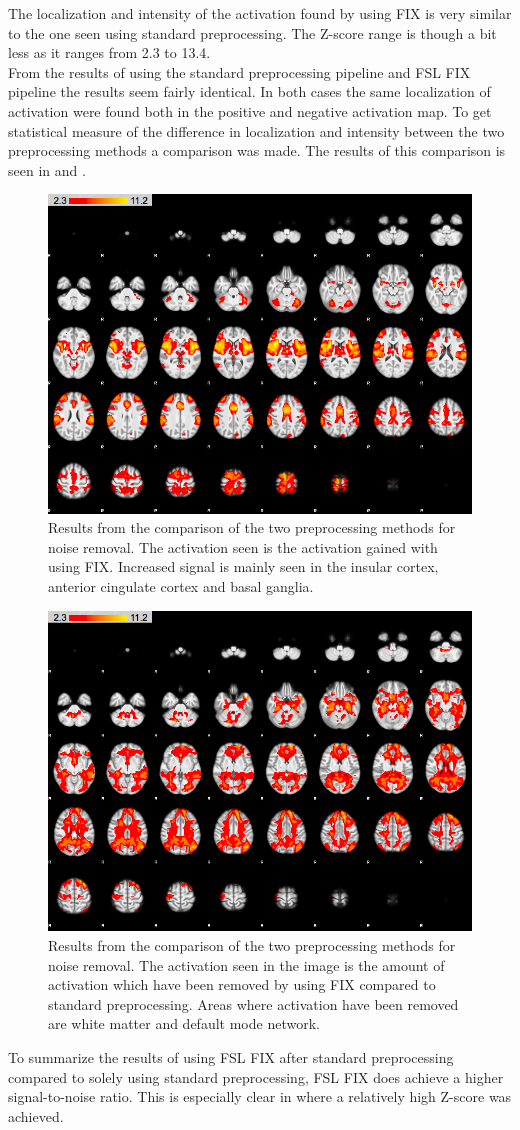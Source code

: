 The localization and intensity of the activation found by using FIX is very similar to the one seen using standard preprocessing. The Z-score range is though a bit less as it ranges from 2.3 to 13.4.\\
From the results of using the standard preprocessing pipeline and FSL FIX pipeline the results seem fairly identical. In both cases the same localization of activation were found both in the positive and negative activation map.   
To get statistical measure of the difference in localization and intensity between the two preprocessing methods a comparison was made. The results of this comparison is seen in  and . 

\begin{figure}[H]                 
	\includegraphics[width=.65\textwidth]{figures/Results/diff_pos}  
	\caption{Results from the comparison of the two preprocessing methods for noise removal. The activation seen is the activation gained with using FIX. Increased signal is mainly seen in the insular cortex, anterior cingulate cortex and basal ganglia.}
	\label{fig:res:diff_pos} 
\end{figure}

\begin{figure}[H]                 
	\includegraphics[width=.65\textwidth]{figures/Results/diff_neg}  
	\caption{Results from the comparison of the two preprocessing methods for noise removal. The activation seen in the image is the amount of activation which have been removed by using FIX compared to standard preprocessing. Areas where activation have been removed are white matter and default mode network.}
	\label{fig:res:diff_neg} 
\end{figure}

To summarize the results of using FSL FIX after standard preprocessing compared to solely using standard preprocessing, FSL FIX does achieve a higher signal-to-noise ratio. This is especially clear in  where a relatively high Z-score was achieved. 
